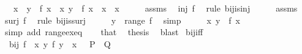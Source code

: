 \begin{isabellebody}
\ \ \ x\ \ {\isachardoublequoteopen}y\ {\isacharequal}{\kern0pt}\ f\ x{\isachardoublequoteclose}\ \ {\isachardoublequoteopen}{\isasymAnd}x{\isacharprime}{\kern0pt}{\isachardot}{\kern0pt}\ y\ {\isacharequal}{\kern0pt}\ f\ x{\isacharprime}{\kern0pt}\ {\isasymLongrightarrow}\ x{\isacharprime}{\kern0pt}\ {\isacharequal}{\kern0pt}\ x{\isachardoublequoteclose}\isanewline
%
\isadelimproof
%
\endisadelimproof
%
\isatagproof
{}\isamarkupfalse%
\ {\isacharminus}{\kern0pt}\isanewline
\ \ \isamarkupfalse%
\ assms\ \isamarkupfalse%
\ {\isachardoublequoteopen}inj\ f{\isachardoublequoteclose}\ \isamarkupfalse%
\ {\isacharparenleft}{\kern0pt}rule\ bij{\isacharunderscore}{\kern0pt}is{\isacharunderscore}{\kern0pt}inj{\isacharparenright}{\kern0pt}\isanewline
\ \ \isamarkupfalse%
\ \isamarkupfalse%
\ assms\ \isamarkupfalse%
\ {\isachardoublequoteopen}surj\ f{\isachardoublequoteclose}\ \isamarkupfalse%
\ {\isacharparenleft}{\kern0pt}rule\ bij{\isacharunderscore}{\kern0pt}is{\isacharunderscore}{\kern0pt}surj{\isacharparenright}{\kern0pt}\isanewline
\ \ \isamarkupfalse%
\ \isamarkupfalse%
\ {\isachardoublequoteopen}y\ {\isasymin}\ range\ f{\isachardoublequoteclose}\ \isamarkupfalse%
\ simp\isanewline
\ \ \isamarkupfalse%
\ \isamarkupfalse%
\ {\isachardoublequoteopen}{\isasymexists}{\isacharbang}{\kern0pt}x{\isachardot}{\kern0pt}\ y\ {\isacharequal}{\kern0pt}\ f\ x{\isachardoublequoteclose}\ \isamarkupfalse%
\ {\isacharparenleft}{\kern0pt}simp\ add{\isacharcolon}{\kern0pt}\ range{\isacharunderscore}{\kern0pt}ex{}{\isacharunderscore}{\kern0pt}eq{\isacharparenright}{\kern0pt}\isanewline
\ \ \isamarkupfalse%
\ that\ \isamarkupfalse%
\ thesis\ \isamarkupfalse%
\ blast\isanewline
{}\isamarkupfalse%
%
\endisatagproof
{\isafoldproof}%
%
\isadelimproof
\isanewline
%
\endisadelimproof
\isanewline
{}\isamarkupfalse%
\ bij{\isacharunderscore}{\kern0pt}iff{\isacharcolon}{\kern0pt}\ \isanewline
\ \ {\isacartoucheopen}bij\ f\ {\isasymlongleftrightarrow}\ {\isacharparenleft}{\kern0pt}{\isasymforall}x{\isachardot}{\kern0pt}\ {\isasymexists}{\isacharbang}{\kern0pt}y{\isachardot}{\kern0pt}\ f\ y\ {\isacharequal}{\kern0pt}\ x{\isacharparenright}{\kern0pt}{\isacartoucheclose}\ \ {\isacharparenleft}{\kern0pt}\ {\isacartoucheopen}{\isacharquery}{\kern0pt}P\ {\isasymlongleftrightarrow}\ {\isacharquery}{\kern0pt}Q{\isacartoucheclose}{\isacharparenright}{\kern0pt}\isanewline

\end{isabellebody}
